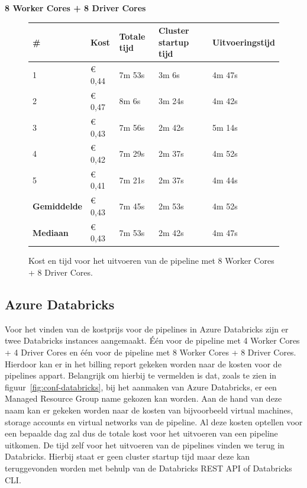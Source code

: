 \textbf{8 Worker Cores + 8 Driver Cores}

\begin{figure}[H]%
    \centering
    \begin{tabularx}{1\textwidth}{ |X|X|X|X|X| }
        \hline
        \textbf{\#} & \textbf{Kost} & \textbf{Totale tijd} & \textbf{Cluster startup tijd} & \textbf{Uitvoeringstijd} \\
        \hline 
        1 & € 0,44 & 7m 53s & 3m 6s & 4m 47s  \\
        \hline
        2 & € 0,47 & 8m 6s & 3m 24s & 4m 42s \\
        \hline
        3 & € 0,43 & 7m 56s & 2m 42s & 5m 14s \\
        \hline
        4 & € 0,42 & 7m 29s & 2m 37s & 4m 52s \\
        \hline
        5 & € 0,41 & 7m 21s & 2m 37s & 4m 44s \\
        \hline
        \textbf{Gemiddelde} & € 0,43 & 7m 45s & 2m 53s & 4m 52s \\
        \hline
        \textbf{Mediaan} & € 0,43 & 7m 53s & 2m 42s & 4m 47s \\
        \hline
    \end{tabularx}
    \caption{Kost en tijd voor het uitvoeren van de pipeline met 8 Worker Cores + 8 Driver Cores.}
\end{figure}

\subsection{Azure Databricks}

Voor het vinden van de kostprijs voor de pipelines in Azure Databricks zijn er twee Databricks instances aangemaakt. Één voor de pipeline met 4 Worker Cores + 4 Driver Cores en één voor de pipeline met 8 Worker Cores + 8 Driver Cores. Hierdoor kan er in het billing report gekeken worden naar de kosten voor de pipelines appart. Belangrijk om hierbij te vermelden is dat, zoals te zien in figuur~\ref{fig:conf-databricks}, bij het aanmaken van Azure Databricks, er een Managed Resource Group name gekozen kan worden. Aan de hand van deze naam kan er gekeken worden naar de kosten van bijvoorbeeld virtual machines, storage accounts en virtual networks van de pipeline. Al deze kosten optellen voor een bepaalde dag zal dus de totale kost voor het uitvoeren van een pipeline uitkomen. De tijd zelf voor het uitvoeren van de pipelines vinden we terug in Databricks. Hierbij staat er geen cluster startup tijd maar deze kan teruggevonden worden met behulp van de Databricks REST API of Databricks CLI.


